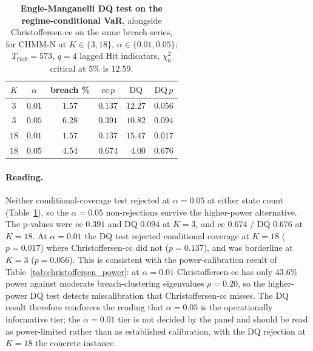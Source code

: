 \begin{table}[!ht]
\centering
\small
\caption{\textbf{Engle-Manganelli DQ test on the regime-conditional VaR}, alongside Christoffersen-cc on the same breach series, for CHMM-N at $K \in \{3, 18\}$, $\alpha \in \{0.01, 0.05\}$; $T_{\text{OoS}} = 573$, $q = 4$ lagged Hit indicators, $\chi^2_6$ critical at $5\%$ is $12.59$.}
\label{tab:engle_manganelli_dq}
\begin{tabular}{c c c c c c}
\toprule
$K$ & $\alpha$ & breach \% & $\text{cc}\,p$ & $\text{DQ}$ & $\text{DQ}\,p$ \\
\midrule
$3$  & $0.01$ & $1.57$ & $0.137$ & $12.27$ & $0.056$ \\
$3$  & $0.05$ & $6.28$ & $0.391$ & $10.82$ & $0.094$ \\
$18$ & $0.01$ & $1.57$ & $0.137$ & $\mathbf{15.47}$ & $\mathbf{0.017}$ \\
$18$ & $0.05$ & $4.54$ & $0.674$ & $\phantom{1}4.00$ & $0.676$ \\
\bottomrule
\end{tabular}
\end{table}

\paragraph{Reading.}
Neither conditional-coverage test rejected at $\alpha = 0.05$ at either state count (Table~\ref{tab:engle_manganelli_dq}), so the $\alpha = 0.05$ non-rejections survive the higher-power alternative. The p-values were cc $0.391$ and DQ $0.094$ at $K = 3$, and cc $0.674$ / DQ $0.676$ at $K = 18$. At $\alpha = 0.01$ the DQ test rejected conditional coverage at $K = 18$ ($p = 0.017$) where Christoffersen-cc did not ($p = 0.137$), and was borderline at $K = 3$ ($p = 0.056$). This is consistent with the power-calibration result of Table~\ref{tab:christoffersen_power}: at $\alpha = 0.01$ Christoffersen-cc has only $43.6\%$ power against moderate breach-clustering eigenvalues $\rho = 0.20$, so the higher-power DQ test detects miscalibration that Christoffersen-cc misses. The DQ result therefore reinforces the reading that $\alpha = 0.05$ is the operationally informative tier; the $\alpha = 0.01$ tier is not decided by the panel and should be read as power-limited rather than as established calibration, with the DQ rejection at $K = 18$ the concrete instance.

